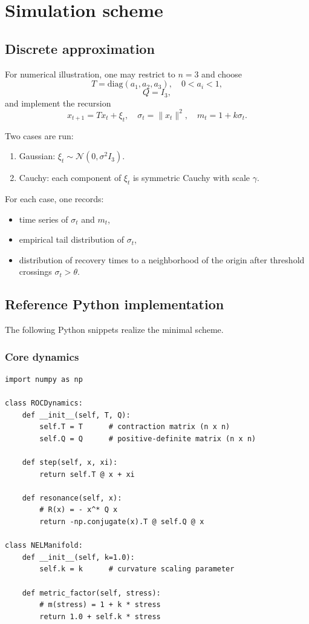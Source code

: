 \documentclass[11pt]{article}
\theoremstyle{plain}
\theoremstyle{definition}
\numberwithin{equation}{section}
\begin{document}
\section{Simulation scheme}

\subsection{Discrete approximation}

For numerical illustration, one may restrict to $n=3$ and choose
\[
T = \mathrm{diag}(a_1,a_2,a_3),
\quad 0 < a_i < 1,
\]
\[
Q = I_3,
\]
and implement the recursion
\begin{equation}
x_{t+1} = T x_t + \xi_t,
\quad
\sigma_t = \|x_t\|^2,
\quad
m_t = 1 + k \sigma_t.
\end{equation}

Two cases are run:
\begin{enumerate}[label=(\alph*)]
  \item Gaussian: $\xi_t \sim \mathcal{N}(0,\sigma^2 I_3)$.
  \item Cauchy: each component of $\xi_t$ is symmetric Cauchy with
    scale $\gamma$.
\end{enumerate}

For each case, one records:
\begin{itemize}
  \item time series of $\sigma_t$ and $m_t$,
  \item empirical tail distribution of $\sigma_t$,
  \item distribution of recovery times to a neighborhood of the origin
    after threshold crossings $\sigma_t > \theta$.
\end{itemize}

\subsection{Reference Python implementation}

The following Python snippets realize the minimal scheme.

\subsubsection*{Core dynamics}

\begin{lstlisting}[style=python,caption={ROC dynamics and NEL metric}]
import numpy as np

class ROCDynamics:
    def __init__(self, T, Q):
        self.T = T      # contraction matrix (n x n)
        self.Q = Q      # positive-definite matrix (n x n)

    def step(self, x, xi):
        return self.T @ x + xi

    def resonance(self, x):
        # R(x) = - x^* Q x
        return -np.conjugate(x).T @ self.Q @ x

class NELManifold:
    def __init__(self, k=1.0):
        self.k = k      # curvature scaling parameter

    def metric_factor(self, stress):
        # m(stress) = 1 + k * stress
        return 1.0 + self.k * stress
\end{lstlisting}
\end{document}
